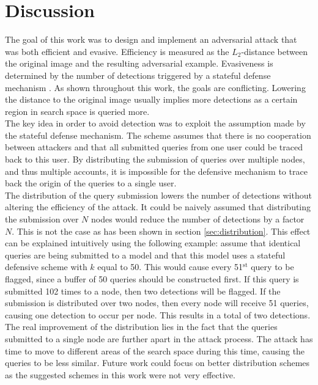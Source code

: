 \chapter{Discussion}\label{chap:discussion}
The goal of this work was to design and implement an adversarial attack that was both efficient and evasive. Efficiency is measured as the $L_2$-distance between the original image and the resulting adversarial example. Evasiveness is determined by the number of detections triggered by a stateful defense mechanism \cite{chen_stateful_2019}. As shown throughout this work, the goals are conflicting. Lowering the distance to the original image usually implies more detections as a certain region in search space is queried more.\\

The key idea in order to avoid detection was to exploit the assumption made by the stateful defense mechanism. The scheme assumes that there is no cooperation between attackers and that all submitted queries from one user could be traced back to this user. By distributing the submission of queries over multiple nodes, and thus multiple accounts, it is impossible for the defensive mechanism to trace back the origin of the queries to a single user.\\

The distribution of the query submission lowers the number of detections without altering the efficiency of the attack. It could be naively assumed that distributing the submission over $N$ nodes would reduce the number of detections by a factor $N$. This is not the case as has been shown in section \ref{sec:distribution}. This effect can be explained intuitively using the following example: assume that identical queries are being submitted to a model and that this model uses a stateful defensive scheme with $k$ equal to 50. This would cause every 51$^{\text{st}}$ query to be flagged, since a buffer of 50 queries should be constructed first. If this query is submitted 102 times to a node, then two detections will be flagged. If the submission is distributed over two nodes, then every node will receive 51 queries, causing one detection to occur per node. This results in a total of two detections. The real improvement of the distribution lies in the fact that the queries submitted to a single node are further apart in the attack process. The attack has time to move to different areas of the search space during this time, causing the queries to be less similar. Future work could focus on better distribution schemes as the suggested schemes in this work were not very effective.\\

